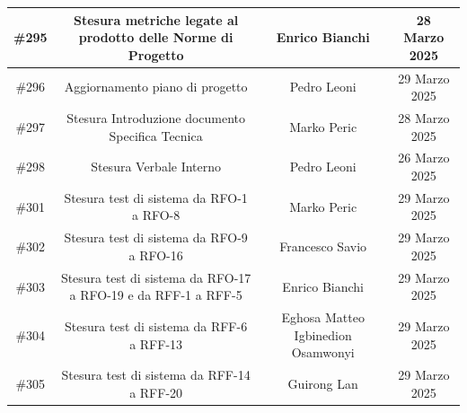 \documentclass[a4paper, 12pt]{article}
\begin{document}
\begin{tabularx}{\textwidth}{|c|C|C|C|}
    \hline
        \#295 & Stesura metriche legate al prodotto delle Norme di Progetto & Enrico Bianchi & 28 Marzo 2025 \\ 
    \hline
        \#296 & Aggiornamento piano di progetto & Pedro Leoni & 29 Marzo 2025 \\ 
    \hline
        \#297 & Stesura Introduzione documento Specifica Tecnica & Marko Peric & 28 Marzo 2025 \\ 
    \hline
        \#298 & Stesura Verbale Interno & Pedro Leoni & 26 Marzo 2025 \\ 
    \hline
        \#301 & Stesura test di sistema da RFO-1 a RFO-8 & Marko Peric & 29 Marzo 2025 \\ 
    \hline
        \#302 & Stesura test di sistema da RFO-9 a RFO-16  & Francesco Savio & 29 Marzo 2025 \\ 
    \hline
        \#303 & Stesura test di sistema da RFO-17 a RFO-19 e da RFF-1 a RFF-5 & Enrico Bianchi & 29 Marzo 2025 \\ 
    \hline
        \#304 & Stesura test di sistema da RFF-6 a RFF-13 & Eghosa Matteo Igbinedion Osamwonyi & 29 Marzo 2025 \\ 
    \hline
        \#305 & Stesura test di sistema da RFF-14 a RFF-20 & Guirong Lan & 29 Marzo 2025 \\ 
    \hline
 \end{tabularx}
\end{document}
